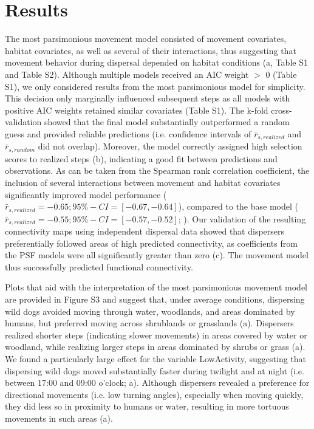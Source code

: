 \documentclass[abstract=on,10pt,a4paper,bibliography=totocnumbered]{article}
\begin{document}
\section{Results}
The most parsimonious movement model consisted of movement covariates, habitat
covariates, as well as several of their interactions, thus suggesting that
movement behavior during dispersal depended on habitat conditions
(a, Table S1 and Table S2). Although multiple models
received an AIC weight \(>\) 0 (Table S1), we only considered results from the
most parsimonious model for simplicity. This decision only marginally influenced
subsequent steps as all models with positive AIC weights retained similar
covariates (Table S1). The k-fold cross-validation showed that the final model
substantially outperformed a random guess and provided reliable predictions
(i.e. confidence intervals of \(\bar{r}_{s, realized}\) and \(\bar{r}_{s,
random}\) did not overlap). Moreover, the model correctly assigned high
selection scores to realized steps (b), indicating a good
fit between predictions and observations. As can be taken from the Spearman rank
correlation coefficient, the inclusion of several interactions between movement
and habitat covariates significantly improved model performance (\(\bar{r}_{s,
realized} = -0.65; 95\%-CI = [-0.67, -0.64]\)), compared to the base model
(\(\bar{r}_{s, realized} = -0.55; 95\%-CI = [-0.57, -0.52]\);
\citealp{Hofmann.2021}). Our validation of the resulting connectivity maps using
independent dispersal data showed that dispersers preferentially followed areas
of high predicted connectivity, as coefficients from the PSF models were all
significantly greater than zero (c). The movement model thus
successfully predicted functional connectivity.

Plots that aid with the interpretation of the most parsimonious movement model
are provided in Figure S3 and suggest that, under average conditions, dispersing
wild dogs avoided moving through water, woodlands, and areas dominated by
humans, but preferred moving across shrublands or grasslands
(a). Dispersers realized shorter steps (indicating slower
movements) in areas covered by water or woodland, while realizing larger steps
in areas dominated by shrubs or grass (a). We found a
particularly large effect for the variable \textsf{LowActivity}, suggesting that
dispersing wild dogs moved substantially faster during twilight and at night
(i.e. between 17:00 and 09:00 o'clock; a). Although
dispersers revealed a preference for directional movements (i.e. low turning
angles), especially when moving quickly, they did less so in proximity to humans
or water, resulting in more tortuous movements in such areas
(a).
\end{document}
